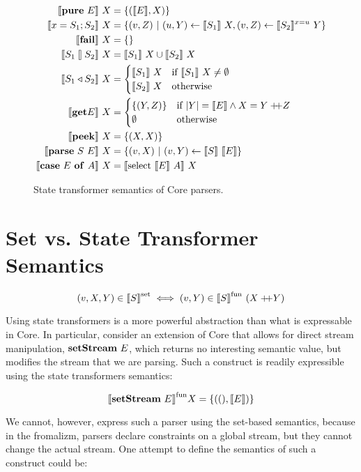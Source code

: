 \documentclass{article}
\begin{document}
\begin{figure}[H]
\begin{align*}
\llbracket{\mathbf{pure}~{E}}\rrbracket~X &= \{{ (\llbracket{E}\rrbracket, X) }\} \\
\llbracket{{x} = {S_1}; {S_2}}\rrbracket~X &=  \{{ (v,Z) ~|~ (u,Y) \leftarrow \llbracket{S_1}\rrbracket~X,
                                        (v,Z) \leftarrow \llbracket{S_2}\rrbracket^{x=u}~Y }\} \\
\llbracket{\mathbf{fail}}\rrbracket~X   &= \{{ }\} \\
\llbracket{{S_1} \talloblong {S_2}}\rrbracket~X &= \llbracket{S_1}\rrbracket~X \cup \llbracket{S_2}\rrbracket~X \\
\llbracket{{S_1} \triangleleft {S_2}}\rrbracket~X &=
  \begin{cases}
  \llbracket{S_1}\rrbracket~X &\text{if}~\llbracket{S_1}\rrbracket~X \neq \emptyset \\
  \llbracket{S_2}\rrbracket~X &\text{otherwise}
  \end{cases} \\
\llbracket{\mathbf{get}{E}}\rrbracket~X &=
  \begin{cases}
  \{{ (Y,Z) }\} &\text{if}~|Y| = \llbracket{E}\rrbracket \wedge X = Y +\!\!\!+ Z \\
  \emptyset     &\text{otherwise}
  \end{cases} \\
\llbracket{\mathbf{peek}}\rrbracket~X &= \{{(X,X)}\} \\
\llbracket{\mathbf{parse}~{S}~{E}}\rrbracket~X &= \{{ (v,X) ~|~ (v,Y) \leftarrow \llbracket{S}\rrbracket~\llbracket{E}\rrbracket }\} \\
\llbracket{\mathbf{case}~{E}~\mathbf{of}~{A}}\rrbracket~X &= \llbracket{\mathrm{select}~{\llbracket{E}\rrbracket}~{A}}\rrbracket~X
\end{align*}
\caption{State transformer semantics of Core parsers.}
\end{figure}


\section{Set vs. State Transformer Semantics}

\[
(v,X,Y) \in {\llbracket{S}\rrbracket}^{\mathrm{set}} \iff (v,Y) \in {\llbracket{S}\rrbracket}^{\mathrm{fun}}~(X +\!\!\!+ Y)
\]

Using state transformers is a more powerful abstraction than what is
expressable in Core. In particular, consider an extension of Core
that allows for direct stream manipulation, $\mathbf{setStream}~{E}$, which returns
no interesting semantic value, but modifies the stream that we are parsing.
Such a construct is readily expressible using the state transformers semantics:

\[
{\llbracket{\mathbf{setStream}~{E}}\rrbracket}^{\mathrm{fun}} X = \{{((),\llbracket{E}\rrbracket)}\}
\]

We cannot, however, express such a parser using the set-based semantics,
because in the fromalizm, parsers declare constraints on a global stream,
but they cannot change the actual stream.  One attempt to define the
semantics of such a construct could be:
\end{document}
